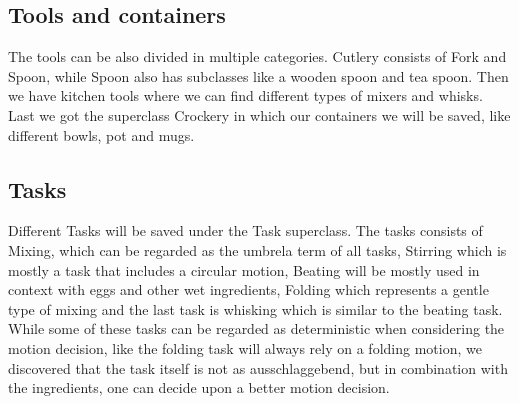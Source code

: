 \subsection*{Tools and containers}
The tools can be also divided in multiple categories. Cutlery consists of Fork and Spoon, while Spoon also has subclasses like a wooden spoon and tea spoon.
Then we have kitchen tools where we can find different types of mixers and whisks. Last we got the superclass Crockery in which our containers we will be saved, like different bowls, pot and mugs.

\subsection*{Tasks}
Different Tasks will be saved under the Task superclass. The tasks consists of Mixing, which can be regarded as the umbrela term of all tasks, Stirring which is mostly a task that includes a circular motion, Beating will be mostly used in context with eggs and other wet ingredients, Folding which represents a gentle type of mixing and the last task is whisking which is similar to the beating task.
While some of these tasks can be regarded as deterministic when considering the motion decision, like the folding task will always rely on a folding motion, we discovered that the task itself is not as ausschlaggebend, but in combination with the ingredients, one can decide upon a better motion decision. 

